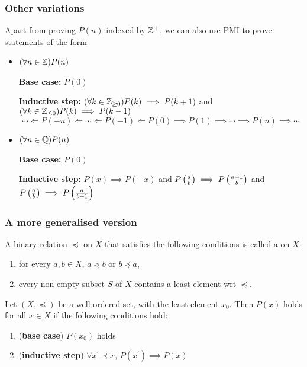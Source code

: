 \subsubsection{Other variations}
Apart from proving $P(n)$ indexed by $\mathbb Z^+$, we can also use PMI to prove statements of the form
\begin{itemize}
\item $(\forall n\in\mathbb Z) P(n)$

\textbf{Base case:} $P(0)$

\textbf{Inductive step:} $(\forall k\in\mathbb Z_{\ge0}) P(k)\implies P(k+1)$ and $(\forall k\in\mathbb Z_{\le0}) P(k)\implies P(k-1)$
\[ \cdots \Longleftarrow P(-n) \Longleftarrow \cdots \Longleftarrow P(-1) \Longleftarrow P(0) \implies P(1) \implies \cdots \implies P(n) \implies \cdots \]

\item $(\forall n\in\mathbb Q) P(n)$

\textbf{Base case:} $P(0)$

\textbf{Inductive step:} $P(x)\implies P(-x)$ and $P\left(\frac{a}{b}\right)\implies P\left(\frac{a+1}{b}\right)$ and $P\left(\frac{a}{b}\right)\implies P\left(\frac{a}{b+1}\right)$
\end{itemize}

\subsubsection{A more generalised version}
\begin{definition}
A binary relation $\preceq$ on $X$ that satisfies the following conditions is called a  on $X$:
\begin{enumerate}[label=(\roman*)]
\item for every $a,b\in X$, $a\preceq b$ or $b\preceq a$,
\item every non-empty subset $S$ of $X$ contains a least element wrt $\preceq$.
\end{enumerate}
\end{definition}

\begin{theorem}
Let $(X,\preceq)$ be a well-ordered set, with the least element $x_0$. Then $P(x)$ holds for all $x\in X$ if the following conditions hold:
\begin{enumerate}[label=(\roman*)]
\item (\textbf{base case}) $P(x_0)$ holds
\item (\textbf{inductive step}) $\forall x^\prime\prec x$, $P(x^\prime)\implies P(x)$
\end{enumerate}
\end{theorem}

